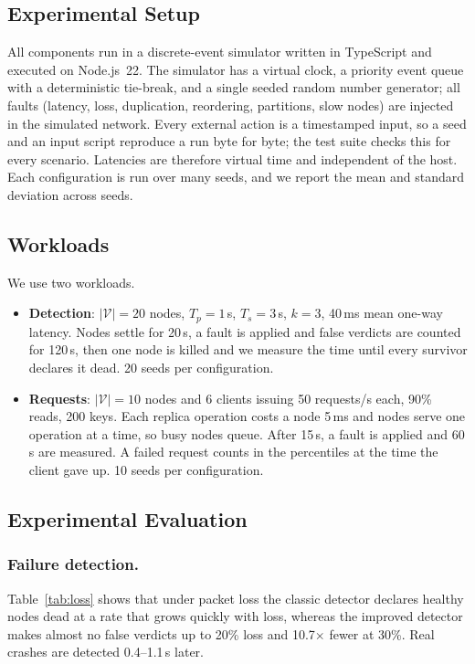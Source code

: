 \documentclass[sigconf,nonacm]{acmart}
\begin{document}
\subsection{Experimental Setup}
All components run in a discrete-event simulator written in TypeScript and executed on Node.js~22. The simulator has a virtual clock, a priority event queue with a deterministic tie-break, and a single seeded random number generator; all faults (latency, loss, duplication, reordering, partitions, slow nodes) are injected in the simulated network. Every external action is a timestamped input, so a seed and an input script reproduce a run byte for byte; the test suite checks this for every scenario. Latencies are therefore virtual time and independent of the host. Each configuration is run over many seeds, and we report the mean and standard deviation across seeds.

\subsection{Workloads}
We use two workloads.
\begin{itemize}
  \item \textbf{Detection}: $|\mathcal{V}| = 20$ nodes, $T_p = 1$\,s, $T_s = 3$\,s, $k = 3$, 40\,ms mean one-way latency. Nodes settle for 20\,s, a fault is applied and false verdicts are counted for 120\,s, then one node is killed and we measure the time until every survivor declares it dead. 20 seeds per configuration.
  \item \textbf{Requests}: $|\mathcal{V}| = 10$ nodes and 6 clients issuing 50 requests/s each, 90\% reads, 200 keys. Each replica operation costs a node 5\,ms and nodes serve one operation at a time, so busy nodes queue. After 15\,s, a fault is applied and 60\,s are measured. A failed request counts in the percentiles at the time the client gave up. 10 seeds per configuration.
\end{itemize}

\subsection{Experimental Evaluation}

\subsubsection{Failure detection.} Table~\ref{tab:loss} shows that under packet loss the classic detector declares healthy nodes dead at a rate that grows quickly with loss, whereas the improved detector makes almost no false verdicts up to 20\% loss and 10.7$\times$ fewer at 30\%. Real crashes are detected 0.4--1.1\,s later.
\end{document}
